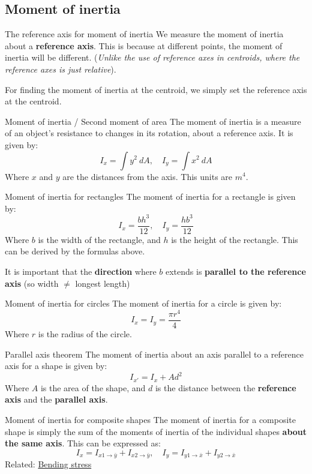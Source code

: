\documentclass{article}
\begin{document}
\label{sec:momentinertia}
\subsection{Moment of inertia}
\begin{knBox}
    {The reference axis for moment of inertia}
    We measure the moment of inertia about a \textbf{reference axis}. This is because at different points, the moment of inertia will be different. (\emph{Unlike the use of reference axes in centroids, where the reference axes is just relative}).

    For finding the moment of inertia at the centroid, we simply set the reference axis at the centroid.
\end{knBox}
\begin{definition}
    {Moment of inertia / Second moment of area}
    The moment of inertia is a measure of an object's resistance to changes in its rotation, about a reference axis. It is given by:
    \[I_x=\int y^2\:dA,\quad I_y=\int x^2\:dA\]
    Where $x$ and $y$ are the distances from the axis. This units are $m^4$.
\end{definition}
\begin{theorem}
    {Moment of inertia for rectangles}
    The moment of inertia for a rectangle is given by:
    \[I_x=\frac{bh^3}{12},\quad I_y=\frac{hb^3}{12}\]
    Where $b$ is the width of the rectangle, and $h$ is the height of the rectangle. This can be derived by the formulas above.

    It is important that the \textbf{direction} where $b$ extends is \textbf{parallel to the reference axis} (so width $\ne$ longest length)
\end{theorem}
\begin{theorem}
    {Moment of inertia for circles}
    The moment of inertia for a circle is given by:
    \[I_x=I_y=\frac{\pi r^4}{4}\]
    Where $r$ is the radius of the circle.
\end{theorem}
\begin{theorem}
    {Parallel axis theorem}
    The moment of inertia about an axis parallel to a reference axis for a shape is given by:
    \[I_{x'}=I_{x}+Ad^2\]
    Where $A$ is the area of the shape, and $d$ is the distance between the \textbf{reference axis} and the \textbf{parallel axis}.
\end{theorem}
\begin{definition}
    {Moment of inertia for composite shapes}
    The moment of inertia for a composite shape is simply the sum of the moments of inertia of the individual shapes \textbf{about the same axis}. This can be expressed as:
    \[I_x=I_{x1\to\bar{y}} + I_{x2\to\bar{y}},\quad I_y=I_{y1\to\bar{x}} + I_{y2\to\bar{x}}\]
    Related: \hyperref[sec:bendingstress]{Bending stress}
\end{definition}
\end{document}
